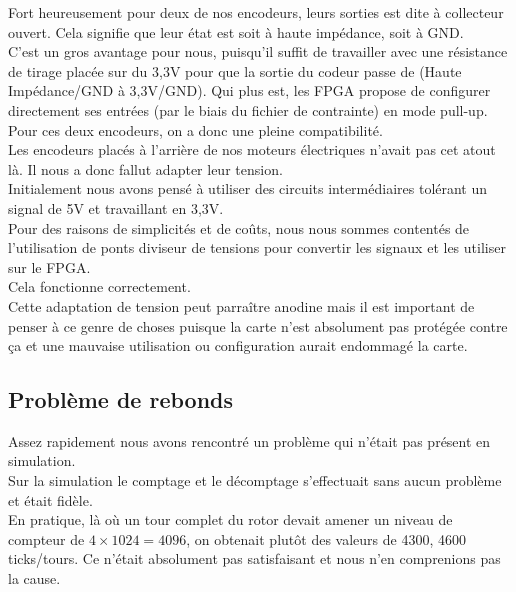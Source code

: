 	Fort heureusement pour deux de nos encodeurs, leurs sorties est dite à collecteur ouvert. Cela signifie que leur état est soit à haute impédance, soit à GND.\\
	C'est un gros avantage pour nous, puisqu'il suffit de travailler avec une résistance de tirage placée sur du 3,3V pour que la sortie du codeur passe de (Haute Impédance/GND à 3,3V/GND). Qui plus est, les FPGA propose de configurer directement ses entrées (par le biais du fichier de contrainte) en mode pull-up.\\
	Pour ces deux encodeurs, on a donc une pleine compatibilité.\\
	
	Les encodeurs placés à l'arrière de nos moteurs électriques n'avait pas cet atout là. Il nous a donc fallut adapter leur tension.\\
	Initialement nous avons pensé à utiliser des circuits intermédiaires tolérant un signal de 5V et travaillant en 3,3V. \\
	Pour des raisons de simplicités et de co\^uts, nous nous sommes contentés de l'utilisation de ponts diviseur de tensions pour convertir les signaux et les utiliser sur le FPGA.\\
	Cela fonctionne correctement.\\
	
	Cette adaptation de tension peut parra\^itre anodine mais il est important de penser à ce genre de choses puisque la carte n'est absolument pas protégée contre ça et une mauvaise utilisation ou configuration aurait endommagé la carte.\\
	
	\subsection{Problème de rebonds}
	Assez rapidement nous avons rencontré un problème qui n'était pas présent en simulation.\\
	Sur la simulation le comptage et le décomptage s'effectuait sans aucun problème et était fidèle.\\
	
	En pratique, là où un tour complet du rotor devait amener un niveau de compteur de $4\times 1024 = 4096$, on obtenait plut\^ot des valeurs de 4300, 4600 ticks/tours. Ce n'était absolument pas satisfaisant et nous n'en comprenions pas la cause.\\
	
